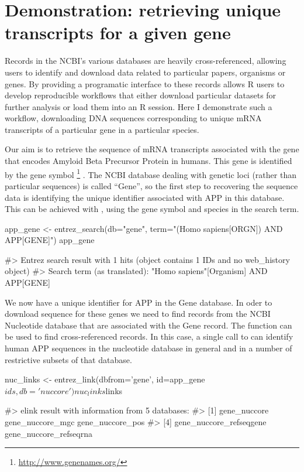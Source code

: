 \section{Demonstration: retrieving unique transcripts for a given gene}

Records in the NCBI's various databases are heavily cross-referenced, allowing
users to identify and download data related to particular papers, organisms or 
genes. By providing a programatic interface to these records 
allows R users to develop reproducible workflows that either download particular
datasets for further analysis or load them into an R session. Here I demonstrate
such a workflow, downloading DNA sequences corresponding to unique
mRNA transcripts of a particular gene in a particular species.

Our aim is to retrieve the sequence of mRNA transcripts associated with the gene 
that encodes Amyloid Beta Precursor Protein in humans. This gene is identified 
by the gene symbol \footnote{\url{http://www.genenames.org/}} . The 
NCBI database dealing with genetic loci (rather than particular sequences) is 
called ``Gene'', so the first step to recovering the sequence data is identifying 
the unique identifier associated with APP in this database. This can be 
achieved with , using the gene symbol and species in the 
search term.

\begin{example}
app_gene <- entrez_search(db="gene", term="(Homo sapiens[ORGN]) AND APP[GENE]")
app_gene

#> Entrez search result with 1 hits (object contains 1 IDs and no web_history object)
#>  Search term (as translated):  "Homo sapiens"[Organism] AND APP[GENE]
\end{example}

We now have a unique identifier for APP in the Gene database. In oder to download 
sequence for these genes we need to find records from the NCBI Nucleotide database 
that are associated with the Gene record. The function  can be 
used to find cross-referenced records. In this case, a single call to 
 can identify human APP sequences in the nucleotide database in 
general and in a number of restrictive subsets of that database.

\begin{example}
nuc_links <- entrez_link(dbfrom='gene', id=app_gene$ids, db='nuccore')
nuc_links$links

#> elink result with information from 5 databases:
#> [1] gene_nuccore            gene_nuccore_mgc        gene_nuccore_pos       
#> [4] gene_nuccore_refseqgene gene_nuccore_refseqrna
\end{example}

